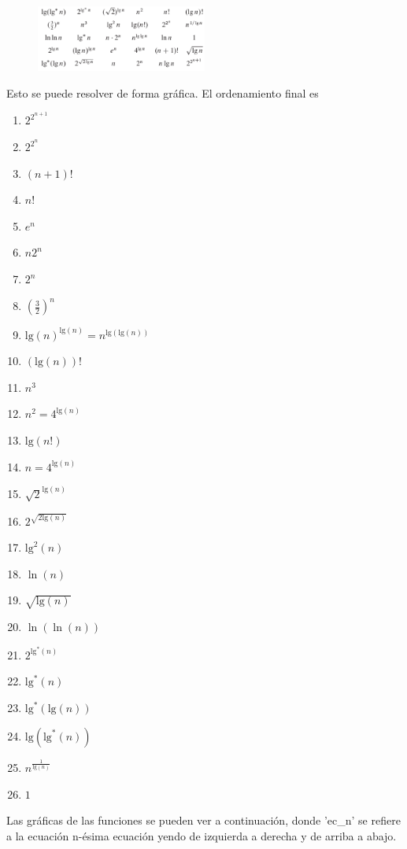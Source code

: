 \documentclass{article}
\begin{document}
\begin{figure}[H]
\centering
\includegraphics[width=0.5\textwidth]{img/ecuaciones_preg2.png}
\end{figure}

Esto se puede resolver de forma gráfica. El ordenamiento final es

\begin{enumerate}
\def\labelenumi{\arabic{enumi}.}
\itemsep1pt\parskip0pt
\item
  $2^{2^{n+1}}$
\item
  $2^{2^{n}}$
\item
  $(n+1)!$
\item
  $n!$
\item $e^n$
\item $n 2^n$
\item $2^n$
\item $(\frac{3}{2})^n$
\item $\textrm{lg}(n)^{\textrm{lg}(n)} = n^{\textrm{lg}( \textrm{lg}(n))}$ 
\item $(\textrm{lg}(n))!$
\item $n^3$
\item $n^2 = 4^{\textrm{lg}(n)}$ 
\item $\textrm{lg}(n!)$
\item $n = 4^{\textrm{lg}(n)}$
\item $\sqrt{2}^{\textrm{lg}(n)}$
\item $2^{\sqrt{2 \textrm{lg}(n)}}$
\item $\textrm{lg}^2(n)$
\item $\ln (n)$
\item $\sqrt{\textrm{lg}(n)}$
\item $\ln(\ln(n))$
\item $2^{\textrm{lg}^*(n)}$
\item $\textrm{lg}^*(n)$
\item $\textrm{lg}^*(\textrm{lg}(n))$
\item $\textrm{lg}(\textrm{lg}^*(n))$
\item $n^{\frac{1}{\textrm{lg}(n)}}$
\item $1$
\end{enumerate}

Las gráficas de las funciones se pueden ver a continuación, donde 'ec\_n' se refiere a la ecuación n-ésima ecuación yendo de izquierda a derecha y de arriba a abajo.
\end{document}
